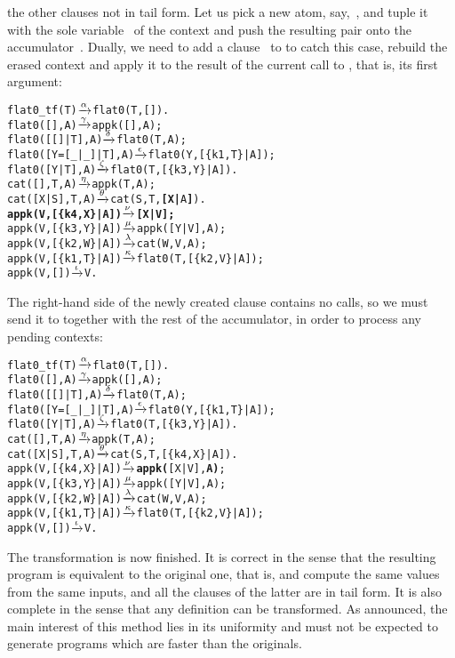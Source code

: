 the other clauses not in tail form. Let us pick a new atom,
say,~, and tuple it with the sole variable~ of
the context \erlcode{[Y|\textvisiblespace]} and push the resulting
pair onto the accumulator~. Dually, we need to add a
clause~\clause{\nu} to  to catch this case, rebuild the
erased context and apply it to the result of the current call to
, that is, its first argument:
\begin{alltt}
flat0\_tf(T)          \(\smashedrightarrow{\alpha}\) flat0(T,[]).
flat0(         [],A) \(\smashedrightarrow{\gamma}\) appk([],A);
flat0(     [[]|T],A) \(\smashedrightarrow{\delta}\) flat0(T,A);
flat0([Y=[\_|\_]|T],A) \(\smashedrightarrow{\epsilon}\) flat0(Y,[\{k1,T\}|A]);
flat0(      [Y|T],A) \(\smashedrightarrow{\zeta}\) flat0(T,[\{k3,Y\}|A]).
cat(   [],T,A)       \(\smashedrightarrow{\eta}\) appk(T,A);
cat([X|S],T,A)       \(\smashedrightarrow{\theta}\) cat(S,T,\textbf{[X|}A\textbf{]}).
\textbf{appk(V,[\{k4,X\}|A])   \(\smashedrightarrow{\nu}\) [X|V];}\hfill% A \emph{unused yet}
appk(V,[\{k3,Y\}|A])   \(\smashedrightarrow{\mu}\) appk([Y|V],A);
appk(V,[\{k2,W\}|A])   \(\smashedrightarrow{\lambda}\) cat(W,V,A);
appk(V,[\{k1,T\}|A])   \(\smashedrightarrow{\kappa}\) flat0(T,[\{k2,V\}|A]);
appk(V,        [])   \(\smashedrightarrow{\iota}\) V.
\end{alltt}
The right\hyp{}hand side of the newly created clause contains no
calls, so we must send it to  together with the rest
of the accumulator, in order to process any pending contexts:
\begin{alltt}
flat0\_tf(T)          \(\smashedrightarrow{\alpha}\) flat0(T,[]).
flat0(         [],A) \(\smashedrightarrow{\gamma}\) appk([],A);
flat0(     [[]|T],A) \(\smashedrightarrow{\delta}\) flat0(T,A);
flat0([Y=[\_|\_]|T],A) \(\smashedrightarrow{\epsilon}\) flat0(Y,[\{k1,T\}|A]);
flat0(      [Y|T],A) \(\smashedrightarrow{\zeta}\) flat0(T,[\{k3,Y\}|A]).
cat(   [],T,A)       \(\smashedrightarrow{\eta}\) appk(T,A);
cat([X|S],T,A)       \(\smashedrightarrow{\theta}\) cat(S,T,[\{k4,X\}|A]).
appk(V,[\{k4,X\}|A])   \(\smashedrightarrow{\nu}\) \textbf{appk(}[X|V],\textbf{A)};
appk(V,[\{k3,Y\}|A])   \(\smashedrightarrow{\mu}\) appk([Y|V],A);
appk(V,[\{k2,W\}|A])   \(\smashedrightarrow{\lambda}\) cat(W,V,A);
appk(V,[\{k1,T\}|A])   \(\smashedrightarrow{\kappa}\) flat0(T,[\{k2,V\}|A]);
appk(V,        [])   \(\smashedrightarrow{\iota}\) V.
\end{alltt}
The transformation is now finished. It is correct in the sense that
the resulting program is equivalent to the original one, that is,
 and  compute the same values
from the same inputs, and all the clauses of the latter are in tail
form. It is also complete in the sense that any definition can be
transformed. As announced, the main interest of this method lies in
its uniformity and must not be expected to generate programs which are
faster than the originals.


